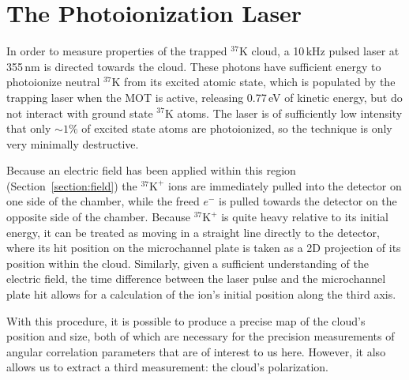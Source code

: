 \section{The Photoionization Laser}
\label{cloud}
\label{photoions}
In order to measure properties of the trapped $^{37}\textrm{K}$ cloud, a 10\,kHz pulsed laser at 355\,nm is directed towards the cloud.  These photons have sufficient energy to photoionize neutral $^{37}\textrm{K}$ from its excited atomic state, which is populated by the trapping laser when the MOT is active, releasing 0.77\,eV of kinetic energy, but do not interact with ground state $^{37}\textrm{K}$ atoms.  The laser is of sufficiently low intensity that only $\sim 1\%$ of excited state atoms are photoionized, so the technique is only very minimally destructive.

Because an electric field has been applied within this region (Section~\ref{section:field})
the $^{37}\textrm{K}^+$ ions are immediately pulled into the detector on one side of the chamber, while the freed $e^-$ is pulled towards the detector on the opposite side of the chamber.  Because  $^{37}\textrm{K}^+$ is quite heavy relative to its initial energy, it can be treated as moving in a straight line directly to the detector, where its hit position on the microchannel plate is taken as a 2D projection of its position within the cloud.  Similarly, given a sufficient understanding of the electric field, the time difference between the laser pulse and the microchannel plate hit allows for a calculation of the ion's initial position along the third axis.  



With this procedure, it is possible to produce a precise map of the cloud's position and size, both of which are necessary for the precision measurements of angular correlation parameters that are of interest to us here.  However, it also allows us to extract a third measurement:  the cloud's polarization.

